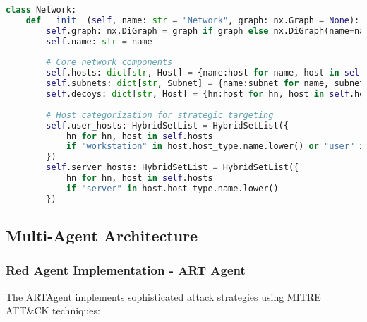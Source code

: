 \documentclass[12pt,a4paper]{article}
\begin{document}
\begin{lstlisting}[language=Python, caption=Network Base Implementation]
class Network:
    def __init__(self, name: str = "Network", graph: nx.Graph = None):
        self.graph: nx.DiGraph = graph if graph else nx.DiGraph(name=name)
        self.name: str = name
        
        # Core network components
        self.hosts: dict[str, Host] = {name:host for name, host in self if isinstance(host, Host)}
        self.subnets: dict[str, Subnet] = {name:subnet for name, subnet in self if isinstance(subnet, Subnet)}
        self.decoys: dict[str, Host] = {hn:host for hn, host in self.hosts if host.decoy}
        
        # Host categorization for strategic targeting
        self.user_hosts: HybridSetList = HybridSetList({
            hn for hn, host in self.hosts 
            if "workstation" in host.host_type.name.lower() or "user" in host.host_type.name.lower()
        })
        self.server_hosts: HybridSetList = HybridSetList({
            hn for hn, host in self.hosts 
            if "server" in host.host_type.name.lower()
        })
\end{lstlisting}

\subsection{Multi-Agent Architecture}

\subsubsection{Red Agent Implementation - ART Agent}

The ARTAgent implements sophisticated attack strategies using MITRE ATT\&CK techniques:
\end{document}
